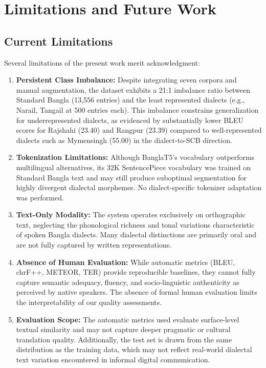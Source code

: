 \documentclass[12pt,a4paper]{article}
\begin{document}
\newpage

\section{Limitations and Future Work}

\subsection{Current Limitations}
Several limitations of the present work merit acknowledgment:

\begin{enumerate}[leftmargin=*]
    \item \textbf{Persistent Class Imbalance:} Despite integrating seven corpora and manual augmentation, the dataset exhibits a 21:1 imbalance ratio between Standard Bangla (13,556 entries) and the least represented dialects (e.g., Narail, Tangail at 500 entries each). This imbalance constrains generalization for underrepresented dialects, as evidenced by substantially lower BLEU scores for Rajshahi (23.40) and Rangpur (23.39) compared to well-represented dialects such as Mymensingh (55.00) in the dialect-to-SCB direction.
    \item \textbf{Tokenization Limitations:} Although BanglaT5's vocabulary outperforms multilingual alternatives, its 32K SentencePiece vocabulary was trained on Standard Bangla text and may still produce suboptimal segmentation for highly divergent dialectal morphemes. No dialect-specific tokenizer adaptation was performed.
    \item \textbf{Text-Only Modality:} The system operates exclusively on orthographic text, neglecting the phonological richness and tonal variations characteristic of spoken Bangla dialects. Many dialectal distinctions are primarily oral and are not fully captured by written representations.
    \item \textbf{Absence of Human Evaluation:} While automatic metrics (BLEU, chrF++, METEOR, TER) provide reproducible baselines, they cannot fully capture semantic adequacy, fluency, and socio-linguistic authenticity as perceived by native speakers. The absence of formal human evaluation limits the interpretability of our quality assessments.
    \item \textbf{Evaluation Scope:} The automatic metrics used evaluate surface-level textual similarity and may not capture deeper pragmatic or cultural translation quality. Additionally, the test set is drawn from the same distribution as the training data, which may not reflect real-world dialectal text variation encountered in informal digital communication.
\end{enumerate}
\end{document}

